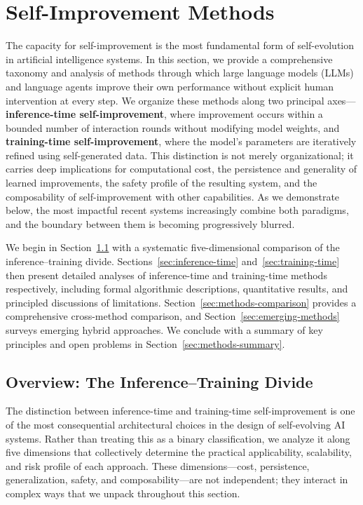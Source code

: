 
\section{Self-Improvement Methods}
\label{sec:methods}

The capacity for self-improvement is the most fundamental form of self-evolution in artificial intelligence systems. In this section, we provide a comprehensive taxonomy and analysis of methods through which large language models (LLMs) and language agents improve their own performance without explicit human intervention at every step. We organize these methods along two principal axes---\textbf{inference-time self-improvement}, where improvement occurs within a bounded number of interaction rounds without modifying model weights, and \textbf{training-time self-improvement}, where the model's parameters are iteratively refined using self-generated data. This distinction is not merely organizational; it carries deep implications for computational cost, the persistence and generality of learned improvements, the safety profile of the resulting system, and the composability of self-improvement with other capabilities. As we demonstrate below, the most impactful recent systems increasingly combine both paradigms, and the boundary between them is becoming progressively blurred.

We begin in Section~\ref{sec:methods-overview} with a systematic five-dimensional comparison of the inference--training divide. Sections~\ref{sec:inference-time} and~\ref{sec:training-time} then present detailed analyses of inference-time and training-time methods respectively, including formal algorithmic descriptions, quantitative results, and principled discussions of limitations. Section~\ref{sec:methods-comparison} provides a comprehensive cross-method comparison, and Section~\ref{sec:emerging-methods} surveys emerging hybrid approaches. We conclude with a summary of key principles and open problems in Section~\ref{sec:methods-summary}.


\subsection{Overview: The Inference--Training Divide}
\label{sec:methods-overview}

The distinction between inference-time and training-time self-improvement is one of the most consequential architectural choices in the design of self-evolving AI systems. Rather than treating this as a binary classification, we analyze it along five dimensions that collectively determine the practical applicability, scalability, and risk profile of each approach. These dimensions---cost, persistence, generalization, safety, and composability---are not independent; they interact in complex ways that we unpack throughout this section.


